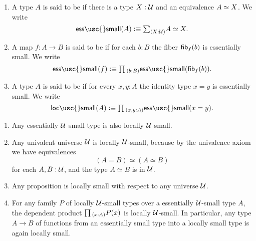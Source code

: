\begin{defn}\label{defn:ess_small}
\begin{enumerate}
\item A type $A$ is said to be  if there is a type $X:\mathcal{U}$ and an equivalence $\eqv{A}{X}$. We write
\begin{equation*}
\mathsf{ess\usc{}small}(A)\defeq\sm{X:\UU}\eqv{A}{X}.
\end{equation*}
\item A map $f:A\to B$ is said to be  if for each $b:B$ the fiber $\mathsf{fib}_{f}(b)$ is essentially small.
We write
\begin{equation*}
\mathsf{ess\usc{}small}(f)\defeq\prd{b:B}\mathsf{ess\usc{}small}(\fib{f}{b}).
\end{equation*}
\item A type $A$ is said to be  if for every $x,y:A$ the identity type $x=y$ is essentially small.
We write
\begin{equation*}
\mathsf{loc\usc{}small}(A)\defeq \prd{x,y:A}\mathsf{ess\usc{}small}(x=y).
\end{equation*}
\end{enumerate}
\end{defn}

\begin{eg}
  \begin{enumerate}
  \item Any essentially $\mathcal{U}$-small type is also locally $\mathcal{U}$-small.
  \item Any univalent universe $\mathcal{U}$ is locally $\mathcal{U}$-small, because by the univalence axiom we have equivalences
    \begin{equation*}
      (A=B)\simeq (A\simeq B)
    \end{equation*}
    for each $A,B:\mathcal{U}$, and the type $A\simeq B$ is in $\mathcal{U}$.
  \item Any proposition is locally small with respect to any universe $\mathcal{U}$.
  \item For any family $P$ of locally $\mathcal{U}$-small types over a essentially $\mathcal{U}$-small type $A$, the dependent product $\prd{x:A}P(x)$ is locally $\mathcal{U}$-small. In particular, any type $A\to B$ of functions from an essentially small type into a locally small type is again locally small.
  \end{enumerate}
\end{eg}

